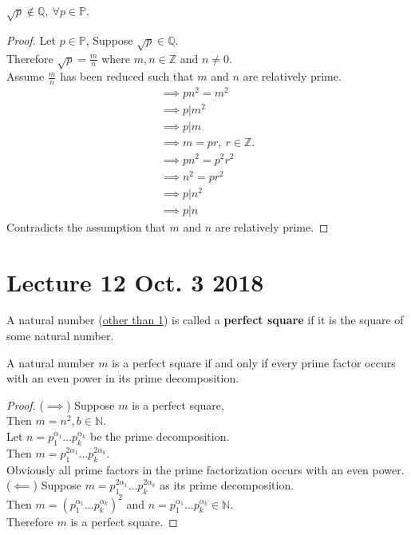 \documentclass[10pt]{article}
\begin{document}
	\begin{example}
		$\sqrt{p} \notin \mathbb{Q},\ \forall p \in \mathbb{P}$.
	\end{example}
	
	\begin{proof}
		Let $p \in \mathbb{P}$,
		Suppose $\sqrt{p} \in \mathbb{Q}$. \\
		Therefore $\sqrt{p} = \frac{m}{n}$ where $m, n \in \mathbb{Z}$ and $n \neq 0$. \\
		Assume $\frac{m}{n}$ has been reduced such that $m$ and $n$ are relatively prime. \\
		\begin{gather*}
			\implies p n^2 = m^2 \\
			\implies p | m^2 \\
			\implies p | m \\
			\implies m = pr,\ r \in \mathbb{Z}. \\
			\implies pn^2 = p^2 r^2 \\
			\implies n^2 = p r^2 \\
			\implies p | n^2 \\
			\implies p | n
		\end{gather*}
		Contradicts the assumption that $m$ and $n$ are relatively prime.
	\end{proof}
	
	\section{Lecture 12 Oct. 3 2018}
	\begin{definition}
		A natural number (\ul{other than 1}) is called a \textbf{perfect square} if it is the square of some natural number.
	\end{definition}
	
	\begin{theorem}
		A natural number $m$ is a perfect square if and only if every prime factor occurs with an even power in its prime decomposition.
	\end{theorem}
	
	\begin{proof}
		($\implies$) Suppose $m$ is a perfect square, \\
		Then $m = n^2, b \in \mathbb{N}$. \\
		Let $n = p_1^{\alpha_1} \dots p_k^{\alpha_k}$ be the prime decomposition. \\
		Then $m = p_1^{2\alpha_1} \dots p_k^{2\alpha_k}$. \\
		Obviously all prime factors in the prime factorization occurs with an even power. \\
		($\impliedby$) Suppose $m = p_1^{2\alpha_1} \dots p_k^{2\alpha_k}$ as its prime decomposition. \\
		Then $m = (p_1^{\alpha_1} \dots p_k^{\alpha_k})^2$ and $n = p_1^{\alpha_1} \dots p_k^{\alpha_k} \in \mathbb{N}$. \\
		Therefore $m$ is a perfect square.
	\end{proof}
	
\end{document}
